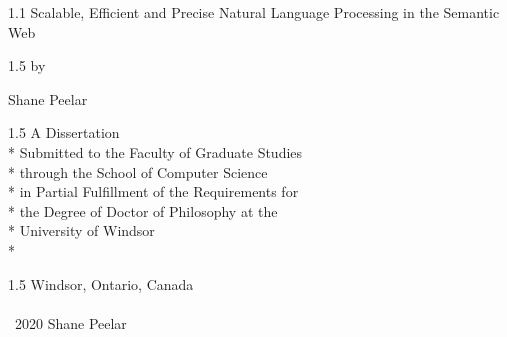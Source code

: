 \documentclass[fleqn, oneside, 12pt]{book}
\author{Shane Peelar}
\title{\dtitle}
\date{\defensedate}
\theoremstyle{definitionsty}
\newcommand{\uwinsinglespacelen}{1.1}
\newcommand{\uwinonehalfspacelen}{1.5}
\newenvironment{uwinsinglespaceenv}%
{\begin{spacing}{\uwinsinglespacelen}}%
	{\end{spacing}}
\newenvironment{uwinonehalfspaceenv}%
{\begin{spacing}{\uwinonehalfspacelen}}%
	{\end{spacing}}
\newcommand{\dtitle}{Scalable, Efficient and Precise Natural Language Processing in the Semantic Web}
\begin{document}
	
\setlength{\abovedisplayskip}{0pt}
\setlength{\belowdisplayskip}{12pt}
\setlength{\abovedisplayshortskip}{0pt}
\setlength{\belowdisplayshortskip}{0pt} 
	
	


\clearpage


\thispagestyle{empty}
\begin{center}
	\vspace*{0in}
	
	\begin{uwinsinglespaceenv}
		\Large{\strong\dtitle}
	\end{uwinsinglespaceenv}
	
	\vspace{0.125in}
	\begin{uwinonehalfspaceenv}
		by
		
		Shane Peelar
	\end{uwinonehalfspaceenv}
	\vspace{1.625in}
	
	\begin{uwinonehalfspaceenv}
	A Dissertation \\*
	Submitted to the Faculty of Graduate Studies \\*
	through the School of Computer Science \\*
	in Partial Fulfillment of the Requirements for \\*
	the Degree of Doctor of Philosophy at the \\*
	University of Windsor \\*
	\end{uwinonehalfspaceenv}
	
	\vspace{0.625in}
	\begin{uwinonehalfspaceenv}
	Windsor, Ontario, Canada \\
	
	
	\phantom{2020} \\
	
	\textcopyright \  2020 Shane Peelar
	\end{uwinonehalfspaceenv}
\end{center}
\end{document}
